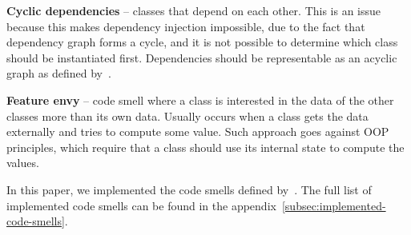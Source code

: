\begin{flushleft}
    \textbf{Cyclic dependencies} -- classes that depend on each other.
    This is an issue because this makes dependency injection impossible, due to the fact that dependency graph forms
    a cycle, and it is not possible to determine which class should be instantiated first.
    Dependencies should be representable as an acyclic graph as defined by~\citeauthor{refactoring-fowler}.
\end{flushleft}

\begin{flushleft}
    \textbf{Feature envy} -- code smell where a class is interested in the data of the other classes
    more than its own data.
    Usually occurs when a class gets the data externally and tries to compute some value.
    Such approach goes against OOP principles, which require that a class should use its internal state to compute the values.
\end{flushleft}


In this paper, we implemented the code smells defined by~\citeauthor{refactoring-fowler}.
The full list of implemented code smells can be found in the appendix~\ref{subsec:implemented-code-smells}.
